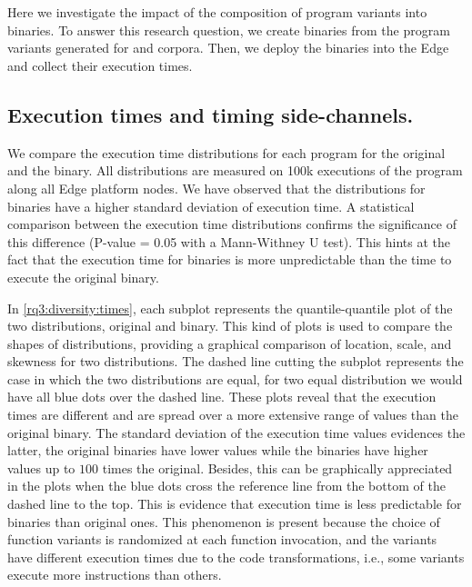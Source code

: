 \section{\rqthree}
\label{results:rq3}

Here we investigate the impact of the composition of program variants into binaries.
To answer this research question, we create binaries from the program variants generated for \corpussodium and \corpusqrcode corpora. Then, we deploy the binaries into the Edge and collect their execution times. 

\subsection*{Execution times and timing side-channels.}


We compare the execution time distributions for each program for the original and the binary. All distributions are measured on 100k executions of the program along all Edge platform nodes.
We have observed that the distributions for binaries have a higher standard deviation of execution time.
A statistical comparison between the execution time distributions confirms the significance of this difference (P-value = 0.05 with a  Mann-Withney U test). This hints at the fact that the execution time for binaries is more unpredictable than the time to execute the original binary. 


In \autoref{rq3:diversity:times}, each subplot represents the quantile-quantile plot \cite{gnanadesikan1968probability} of the two distributions, original and binary.
This kind of plots is used to compare the shapes of distributions, providing a graphical comparison of location, scale, and skewness for two distributions.
The dashed line cutting the subplot represents the case in which the two distributions are equal, \ie for two equal distribution we would have all blue dots over the dashed line. These plots reveal that the execution times are different and are spread over a more extensive range of values than the original binary.
The standard deviation of the execution time values evidences the latter, the original binaries have lower values while the binaries have higher values up to $100$ times the original. Besides, this can be graphically appreciated in the plots when the blue dots cross the reference line from the bottom of the dashed line to the top.
This is evidence that execution time is less predictable for binaries than original ones.
This phenomenon is present because the choice of function variants is randomized at each function invocation, and the variants have different execution times due to the code transformations, i.e., some variants execute more instructions than others. 
 

